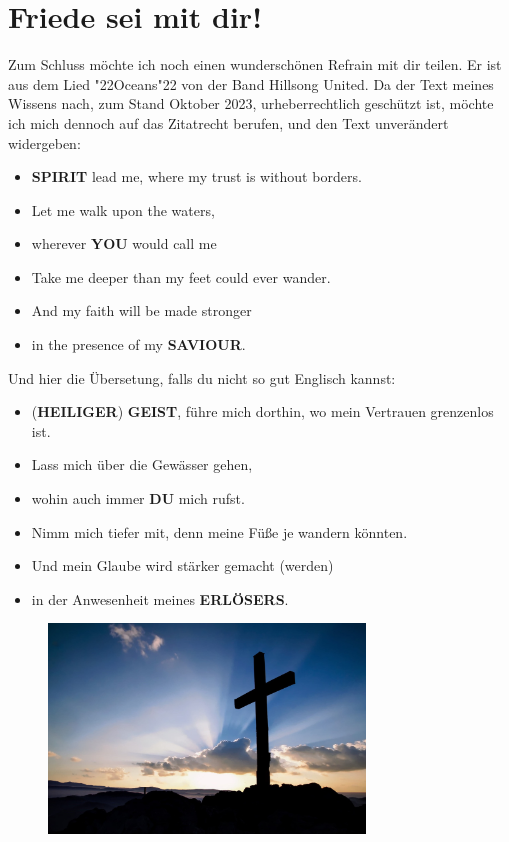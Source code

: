 \documentclass[10pt,a5paper]{article}
\newcommand{\Du}[0]{\textbf{DU}}
\newcommand{\Erloesers}[0]{\textbf{ERL\"OSERS}}
\newcommand{\Geist}[0]{\textbf{GEIST}}
\newcommand{\Heiliger}[0]{\textbf{HEILIGER}}
\newcommand{\Saviour}[0]{\textbf{SAVIOUR}}
\newcommand{\Spirit}[0]{\textbf{SPIRIT}}
\newcommand{\You}[0]{\textbf{YOU}}
\newcommand{\q}[1]{\char"22{#1}\char"22 }
\begin{document}
	\section{Friede sei mit dir!}
		Zum Schluss m\"ochte ich noch einen wundersch\"onen Refrain mit dir teilen.
		Er ist aus dem Lied \q{Oceans} von der Band Hillsong United.
		Da der Text meines Wissens nach,
		zum Stand Oktober 2023,
		urheberrechtlich gesch\"utzt ist,
		m\"ochte ich mich dennoch auf das Zitatrecht berufen,
		und den Text unver\"andert widergeben:
		\\	
		\begin{itemize}[nosep]
			\item[]	{\Spirit} lead me,
					where my trust is without borders.
			\item[] Let me walk upon the waters,
			\item[] wherever {\You} would call me
			\item[]	Take me deeper than my feet could ever wander.
			\item[]	And my faith will be made stronger
			\item[]	in the presence of my {\Saviour}.
			\\
		\end{itemize}
		Und hier die \"Ubersetung,
		falls du nicht so gut Englisch kannst:
		\\
		\begin{itemize}[nosep]
			\item[]	({\Heiliger}) {\Geist},
					f\"uhre mich dorthin,
					wo mein Vertrauen grenzenlos ist.
			\item[]	Lass mich \"uber die Gew\"asser gehen,
			\item[] wohin auch immer {\Du} mich rufst.
			\item[]	Nimm mich tiefer mit,
					denn meine F\"u{\ss}e je wandern k\"onnten.
			\item[]	Und mein Glaube wird st\"arker gemacht (werden)
			\item[]	in der Anwesenheit meines {\Erloesers}.
			\\
		\end{itemize}
		\begin{figure}[h]
			\centering
			\includegraphics[width=0.75\textwidth,keepaspectratio]{"FreeChristian.jpeg"}
		\end{figure}
\end{document}
